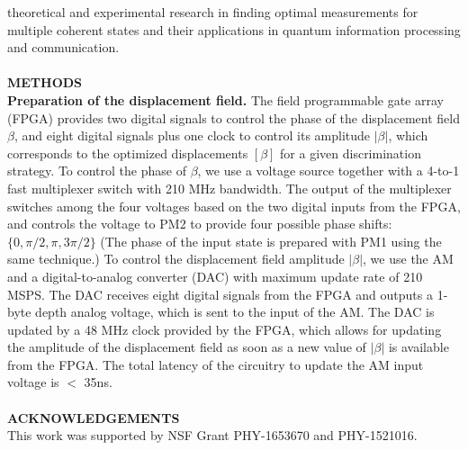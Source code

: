 \documentclass[twocolumn,pra,preprintnumbers,amsmath,amssymb,superscriptaddress,floatfix]{revtex4}%
\begin{document}
theoretical and experimental research in finding optimal
measurements for multiple coherent states and their applications in
quantum information processing and communication.
\\
\\
\textbf{METHODS}\\
\textbf{Preparation of the displacement field.}
The field programmable gate array (FPGA)
provides two digital signals to control the phase of the displacement field $\beta$,
and eight digital signals plus one clock to control its amplitude $|\beta|$, which
corresponds to the optimized displacements $[\beta]$ for a given discrimination strategy.
To control the phase of $\beta$, we use a voltage source together with a 4-to-1 fast multiplexer switch with 210 MHz bandwidth.
The output of the multiplexer switches among the four voltages based on the two digital inputs from the FPGA,
and controls the voltage to PM2 to provide four
possible phase shifts: $\{0,\pi/2,\pi, 3\pi/2\}$ (The phase of the input state is prepared
with PM1 using the same technique.) To control the displacement field amplitude $|\beta|$,
we use the AM and a digital-to-analog converter (DAC) with maximum update rate of 210 MSPS.
The DAC receives eight digital signals from the FPGA and outputs a 1-byte depth analog voltage,
which is sent to the input of the AM. The DAC is updated by a 48 MHz clock provided by the FPGA,
which allows for updating the amplitude of the displacement field as soon as a
new value of $|\beta|$ is available from the FPGA. The total latency
of the circuitry to update the AM input voltage is $<$ 35ns.
%
\\
\\
\noindent
\textbf{ACKNOWLEDGEMENTS}
\\
This work was supported by NSF Grant PHY-1653670 and PHY-1521016.
\\
\\
%
\end{document}

